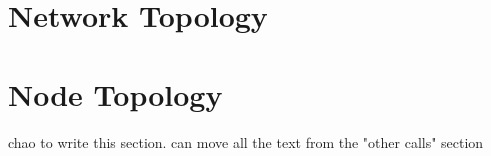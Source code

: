 \section{Network Topology}
\section{Node Topology}
chao to write this section.
can move all the text from the "other calls" section
